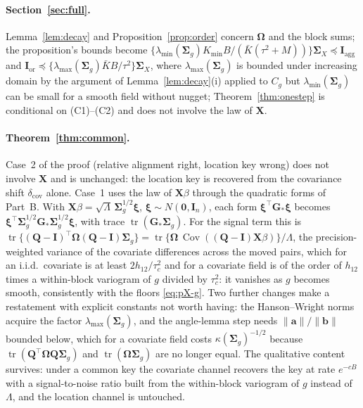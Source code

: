 \documentclass[11pt]{article}
\theoremstyle{definition}
\newcommand{\bX}{\mathbf{X}}
\newcommand{\bI}{\mathbf{I}}
\newcommand{\bzero}{\mathbf{0}}
\newcommand{\bSig}{\boldsymbol{\Sigma}}
\newcommand{\bOm}{\boldsymbol{\Omega}}
\newcommand{\Cov}{\operatorname{Cov}}
\newcommand{\tr}{\operatorname{tr}}
\newcommand{\agg}{\mathrm{agg}}
\newcommand{\orc}{\mathrm{or}}
\begin{document}
\paragraph{Section~\ref{sec:full}.} Lemma~\ref{lem:decay} and Proposition~\ref{prop:order} concern $\bOm$ and the block sums; the proposition's bounds become $\{\lambda_{\min}(\bSig_g)K_{\min}B/(\bar K(\tau^2+M))\}\bSig_X\preceq\mathbf I_\agg$ and $\mathbf I_\orc\preceq\{\lambda_{\max}(\bSig_g)\bar KB/\tau^2\}\bSig_X$, where $\lambda_{\max}(\bSig_g)$ is bounded under increasing domain by the argument of Lemma~\ref{lem:decay}(i) applied to $C_g$ but $\lambda_{\min}(\bSig_g)$ can be small for a smooth field without nugget; Theorem~\ref{thm:onestep} is conditional on (C1)--(C2) and does not involve the law of $\bX$.

\paragraph{Theorem~\ref{thm:common}.} Case~2 of the proof (relative alignment right, location key wrong) does not involve $\bX$ and is unchanged: the location key is recovered from the covariance shift $\delta_{\mathrm{cov}}$ alone. Case~1 uses the law of $\bX\beta$ through the quadratic forms of Part~B. With $\bX\beta=\sqrt\Lambda\,\bSig_g^{1/2}\bm\xi$, $\bm\xi\sim N(\bzero,\bI_n)$, each form $\bm\xi^\top\mathbf G_\ast\bm\xi$ becomes $\bm\xi^\top\bSig_g^{1/2}\mathbf G_\ast\bSig_g^{1/2}\bm\xi$, with trace $\tr(\mathbf G_\ast\bSig_g)$. For the signal term this is $\tr\{(\mathbf Q-\bI)^\top\bOm(\mathbf Q-\bI)\bSig_g\}=\tr\{\bOm\,\Cov((\mathbf Q-\bI)\bX\beta)\}/\Lambda$, the precision-weighted variance of the covariate differences across the moved pairs, which for an i.i.d.\ covariate is at least $2h_{12}/\tau_c^2$ and for a covariate field is of the order of $h_{12}$ times a within-block variogram of $g$ divided by $\tau_c^2$: it vanishes as $g$ becomes smooth, consistently with the floors \eqref{eq:pX-g}. Two further changes make a restatement with explicit constants not worth having: the Hanson--Wright norms acquire the factor $\lambda_{\max}(\bSig_g)$, and the angle-lemma step needs $\|\bm a\|/\|\bm b\|$ bounded below, which for a covariate field costs $\kappa(\bSig_g)^{-1/2}$ because $\tr(\mathbf Q^\top\bOm\mathbf Q\bSig_g)$ and $\tr(\bOm\bSig_g)$ are no longer equal. The qualitative content survives: under a common key the covariate channel recovers the key at rate $e^{-cB}$ with a signal-to-noise ratio built from the within-block variogram of $g$ instead of $\Lambda$, and the location channel is untouched.
\end{document}
